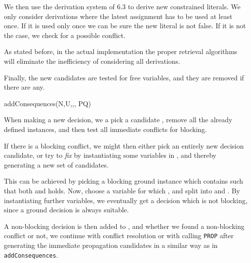 \documentclass[a4paper]{article}
\begin{document}
{We then use the derivation system of 6.3 to derive new constrained literals. We only consider derivations 
where the latest assignment has to be used at least once. If it is used only once we can be sure the new 
literal is not false. If it is not the case, we check for a possible conflict.

As stated before, in the actual implementation the proper retrieval algorithms will eliminate the inefficiency of considering all derivations.

Finally, the new candidates are tested for free variables, and they are removed if there are any.
\begin{function}
	
	\caption{addConsequences(N,U,,, PQ)}
  \;
	\;
	\;
\end{function}
When making a new decision, we a pick a candidate , 
remove all the already defined instances, and then 
test all immediate conflicts for blocking. 

If there is a blocking conflict, 
we might then either pick an entirely new decision candidate, or try to \emph{fix}  by instantiating some variables in , and thereby generating a new set of candidates.  

This can be achieved by picking a blocking ground instance  which contains  such that
both  and  holds. 
Now, choose a variable for which , and
split  into  and .
By instantiating further variables, we eventually get a decision which is not blocking, since a ground decision is always suitable.

A non-blocking decision is then added to , and whether we found a non-blocking conflict or not, we continue with conflict 
resolution or with calling \texttt{PROP} after generating the immediate propagation candidates in a similar way as in \texttt{addConsequences}.

}
\end{document}
